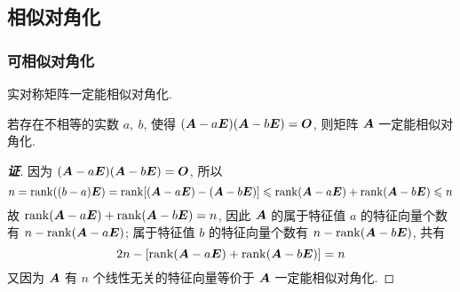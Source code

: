 % 

\subsection{相似对角化}

\subsubsection{可相似对角化}

\begin{theorem}
    实对称矩阵一定能相似对角化.
\end{theorem}

\begin{theorem}
    若存在不相等的实数 $a,~b$, 使得 $(\vb*{A}-a\vb*{E})(\vb*{A}-b\vb*{E})=\vb*{O}$, 则矩阵 $\vb*{A}$ 一定能相似对角化.
\end{theorem}
\begin{proof}[{\songti \textbf{证}}]
    因为 $(\vb*{A}-a\vb*{E})(\vb*{A}-b\vb*{E})=\vb*{O}$, 所以 $$n=\rank((b-a)\vb*{E})=\rank[(\vb*{A}-a\vb*{E})-(\vb*{A}-b\vb*{E})]\leqslant \rank(\vb*{A}-a\vb*{E})+\rank(\vb*{A}-b\vb*{E})\leqslant n$$
    故 $\rank(\vb*{A}-a\vb*{E})+\rank(\vb*{A}-b\vb*{E})=n$, 因此 $\vb*{A}$ 的属于特征值 $a$ 的特征向量个数有 $n-\rank(\vb*{A}-a\vb*{E})$; 属于特征值 $b$ 的特征向量个数有 $n-\rank(\vb*{A}-b\vb*{E})$, 共有
    $$2n-\qty[\rank(\vb*{A}-a\vb*{E})+\rank(\vb*{A}-b\vb*{E})]=n$$
    又因为 $\vb*{A}$ 有 $n$ 个线性无关的特征向量等价于 $\vb*{A}$ 一定能相似对角化.
\end{proof}

